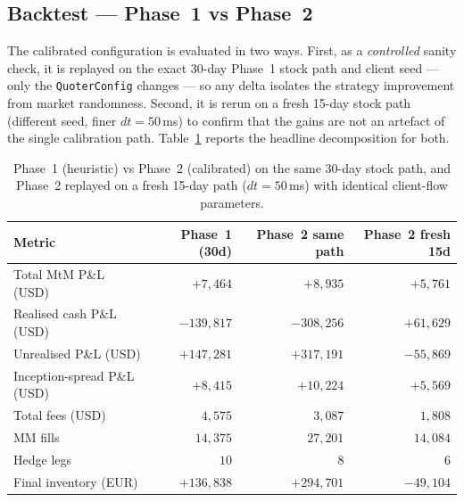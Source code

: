 \subsection{Backtest --- Phase~1 vs Phase~2}

The calibrated configuration is evaluated in two ways. First, as a
\emph{controlled} sanity check, it is replayed on the exact 30-day
Phase~1 stock path and client seed --- only the \texttt{QuoterConfig}
changes --- so any delta isolates the strategy improvement from
market randomness. Second, it is rerun on a fresh 15-day stock path
(different seed, finer $dt = 50$\,ms) to confirm that the gains are
not an artefact of the single calibration path.
Table~\ref{tab:p1-vs-p2} reports the headline decomposition for both.

\begin{table}[ht]
\centering
\begin{tabular}{lrrr}
\toprule
Metric & Phase~1 (30d) & Phase~2 same path & Phase~2 fresh 15d \\
\midrule
Total MtM P\&L (USD)         & $+7{,}464$    & $+8{,}935$    & $+5{,}761$ \\
Realised cash P\&L (USD)     & $-139{,}817$  & $-308{,}256$  & $+61{,}629$ \\
Unrealised P\&L (USD)        & $+147{,}281$  & $+317{,}191$  & $-55{,}869$ \\
Inception-spread P\&L (USD)  & $+8{,}415$    & $+10{,}224$   & $+5{,}569$ \\
Total fees (USD)             & $4{,}575$     & $3{,}087$     & $1{,}808$ \\
MM fills                     & $14{,}375$    & $27{,}201$    & $14{,}084$ \\
Hedge legs                   & $10$          & $8$           & $6$ \\
Final inventory (EUR)        & $+136{,}838$  & $+294{,}701$  & $-49{,}104$ \\
\bottomrule
\end{tabular}
\caption{Phase~1 (heuristic) vs Phase~2 (calibrated) on the same
30-day stock path, and Phase~2 replayed on a fresh 15-day path
($dt = 50$\,ms) with identical client-flow parameters.}
\label{tab:p1-vs-p2}
\end{table}

